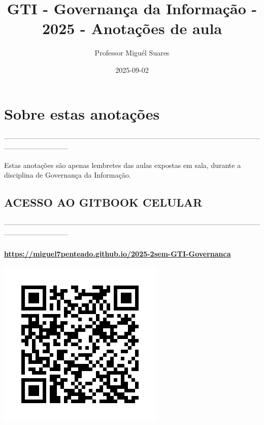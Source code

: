 \documentclass[
]{book}
\title{GTI - Governança da Informação - 2025 - Anotações de aula}
\author{Professor Miguél Suares}
\date{2025-09-02}
\begin{document}
\maketitle

{
\setcounter{tocdepth}{1}
\tableofcontents
}
\chapter*{Sobre estas anotações}\label{sobre-estas-anotauxe7uxf5es}

---------------------------------------------------------------------------------------------------------------------------------------

Estas anotações são apenas lembretes das aulas expostas em sala, durante a disciplina de Governança da Informação.

\section{ACESSO AO GITBOOK CELULAR}\label{acesso-ao-gitbook-celular}

---------------------------------------------------------------------------------------------------------------------------------------

\subsubsection{\texorpdfstring{\url{https://miguel7penteado.github.io/2025-2sem-GTI-Governanca}}{https://miguel7penteado.github.io/2025-2sem-GTI-Governanca}}\label{httpsmiguel7penteado.github.io2025-2sem-gti-governanca}

\includegraphics{images/qr-code-disciplina.jpg}
\end{document}

